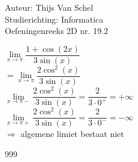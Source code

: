 \documentclass[a4paper]{article}
\begin{document}
  
\noindent \large Auteur: Thijs Van Schel\\
\noindent \large Studierichting: Informatica\\
\noindent \large Oefeningenreeks 2D nr. 19.2\\

\medskip
\normalsize

$\lim\limits_{x \to \pi} \dfrac{1 + \cos(2x)}{3\sin(x)}$  \\

$= \lim\limits_{x \to \pi} \dfrac{2\cos^2(x)}{3\sin(x)}$  \\

$\lim\limits_{x \to \pi-} \dfrac{2\cos^2(x)}{3\sin(x)} = \dfrac{2}{3 \cdot 0^+} = +\infty$  \\

$\lim\limits_{x \to \pi+} \dfrac{2\cos^2(x)}{3\sin(x)} = \dfrac{2}{3 \cdot 0^-} = -\infty$  \\

$\Rightarrow$ algemene limiet bestaat niet\\

\begin{thebibliography}{999}
\end{thebibliography}
\end{document}
